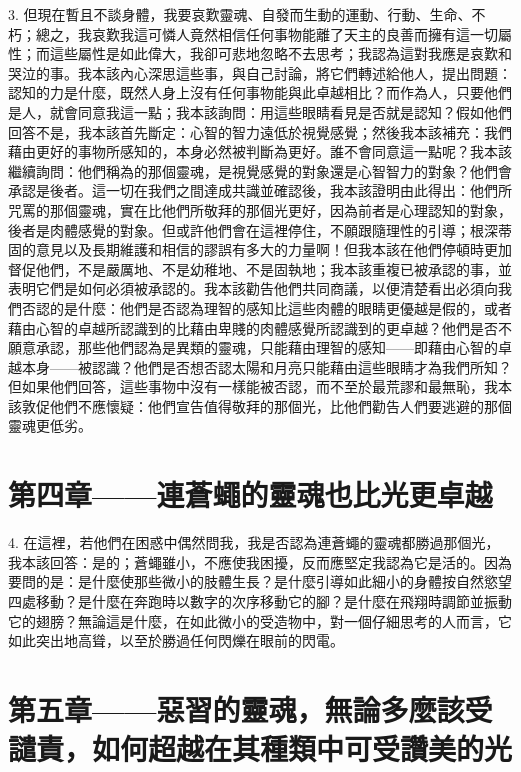 3. 但現在暫且不談身體，我要哀歎靈魂、自發而生動的運動、行動、生命、不朽；總之，我哀歎我這可憐人竟然相信任何事物能離了天主的良善而擁有這一切屬性；而這些屬性是如此偉大，我卻可悲地忽略不去思考；我認為這對我應是哀歎和哭泣的事。我本該內心深思這些事，與自己討論，將它們轉述給他人，提出問題：認知的力是什麼，既然人身上沒有任何事物能與此卓越相比？而作為人，只要他們是人，就會同意我這一點；我本該詢問：用這些眼睛看見是否就是認知？假如他們回答不是，我本該首先斷定：心智的智力遠低於視覺感覺；然後我本該補充：我們藉由更好的事物所感知的，本身必然被判斷為更好。誰不會同意這一點呢？我本該繼續詢問：他們稱為的那個靈魂，是視覺感覺的對象還是心智智力的對象？他們會承認是後者。這一切在我們之間達成共識並確認後，我本該證明由此得出：他們所咒罵的那個靈魂，實在比他們所敬拜的那個光更好，因為前者是心理認知的對象，後者是肉體感覺的對象。但或許他們會在這裡停住，不願跟隨理性的引導；根深蒂固的意見以及長期維護和相信的謬誤有多大的力量啊！但我本該在他們停頓時更加督促他們，不是嚴厲地、不是幼稚地、不是固執地；我本該重複已被承認的事，並表明它們是如何必須被承認的。我本該勸告他們共同商議，以便清楚看出必須向我們否認的是什麼：他們是否認為理智的感知比這些肉體的眼睛更優越是假的，或者藉由心智的卓越所認識到的比藉由卑賤的肉體感覺所認識到的更卓越？他們是否不願意承認，那些他們認為是異類的靈魂，只能藉由理智的感知——即藉由心智的卓越本身——被認識？他們是否想否認太陽和月亮只能藉由這些眼睛才為我們所知？但如果他們回答，這些事物中沒有一樣能被否認，而不至於最荒謬和最無恥，我本該敦促他們不應懷疑：他們宣告值得敬拜的那個光，比他們勸告人們要逃避的那個靈魂更低劣。\par


\section{第四章——連蒼蠅的靈魂也比光更卓越}

4. 在這裡，若他們在困惑中偶然問我，我是否認為連蒼蠅的靈魂都勝過那個光，我本該回答：是的；蒼蠅雖小，不應使我困擾，反而應堅定我認為它是活的。因為要問的是：是什麼使那些微小的肢體生長？是什麼引導如此細小的身體按自然慾望四處移動？是什麼在奔跑時以數字的次序移動它的腳？是什麼在飛翔時調節並振動它的翅膀？無論這是什麼，在如此微小的受造物中，對一個仔細思考的人而言，它如此突出地高聳，以至於勝過任何閃爍在眼前的閃電。\par


\section{第五章——惡習的靈魂，無論多麼該受譴責，如何超越在其種類中可受讚美的光}

